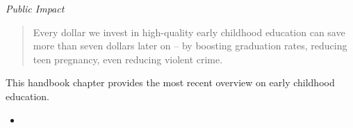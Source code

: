 \begin{frame}\begin{figure}
\end{figure}\end{frame}
\begin{frame}\begin{center}
\LARGE\textit{Public Impact}
\end{center}\end{frame}
\begin{frame}
\begin{quote}\Large
Every dollar we invest in high-quality early childhood education can save more than seven dollars later on -- by boosting graduation rates, reducing teen pregnancy, even reducing violent crime.
\end{quote}
\end{frame}
\begin{frame}\begin{figure}
\end{figure}\end{frame}
\begin{frame}
This handbook chapter provides the most recent overview on early childhood education.
\begin{itemize}
\item {}
\end{itemize}
\end{frame}
